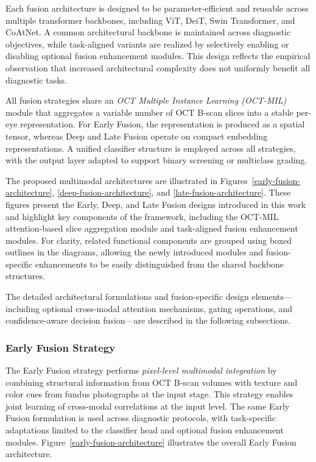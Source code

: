 \documentclass[preprint,12pt]{elsarticle}
\begin{document}
Each fusion architecture is designed to be parameter-efficient and reusable across multiple transformer backbones, including ViT, DeiT, Swin Transformer, and CoAtNet. A common architectural backbone is maintained across diagnostic objectives, while task-aligned variants are realized by selectively enabling or disabling optional fusion enhancement modules. This design reflects the empirical observation that increased architectural complexity does not uniformly benefit all diagnostic tasks.

All fusion strategies share an \textit{OCT Multiple Instance Learning (OCT-MIL)} module that aggregates a variable number of OCT B-scan slices into a stable per-eye representation. For Early Fusion, the representation is produced as a spatial tensor, whereas Deep and Late Fusion operate on compact embedding representations. A unified classifier structure is employed across all strategies, with the output layer adapted to support binary screening or multiclass grading.

The proposed multimodal architectures are illustrated in Figures~\ref{early-fusion-architecture}, \ref{deep-fusion-architecture}, and \ref{late-fusion-architecture}. These figures present the Early, Deep, and Late Fusion designs introduced in this work and highlight key components of the framework, including the OCT-MIL attention-based slice aggregation module and task-aligned fusion enhancement modules. For clarity, related functional components are grouped using boxed outlines in the diagrams, allowing the newly introduced modules and fusion-specific enhancements to be easily distinguished from the shared backbone structures.

The detailed architectural formulations and fusion-specific design elements—including optional cross-modal attention mechanisms, gating operations, and confidence-aware decision fusion—are described in the following subsections.

\subsubsection{Early Fusion Strategy}
\label{subsubsec-earlyfusion}

The Early Fusion strategy performs \emph{pixel-level multimodal integration} by combining structural information from OCT B-scan volumes with texture and color cues from fundus photographs at the input stage. This strategy enables joint learning of cross-modal correlations at the input level. The same Early Fusion formulation is used across diagnostic protocols, with task-specific adaptations limited to the classifier head and optional fusion enhancement modules. Figure~\ref{early-fusion-architecture} illustrates the overall Early Fusion architecture.
\end{document}
